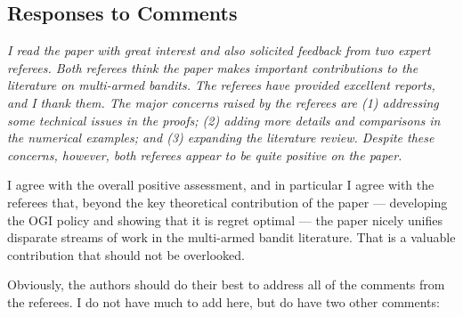 \documentclass[11pt]{article}
\newcommand{\1}{\ensuremath{\mathbf{1}}} %
\theoremstyle{thm-sf}
\begin{document}
	\subsection{Responses to Comments}
	{\it I read the paper with great interest and also solicited feedback from two expert referees. Both referees think the paper makes important contributions to the literature on multi-armed bandits. The referees have provided excellent reports, and I thank them. The major concerns raised by the referees are (1) addressing some technical issues in the proofs; (2) adding more details and comparisons in the numerical examples; and (3) expanding the literature review. Despite these concerns, however, both referees appear to be quite positive on the paper.
		
	I agree with the overall positive assessment, and in particular I agree with the referees that, beyond the key theoretical contribution of the paper --- developing the OGI policy and showing that it is regret optimal --- the paper nicely unifies disparate streams of work in the multi-armed bandit literature. That is a valuable contribution that should not be overlooked.
	
	Obviously, the authors should do their best to address all of the comments from the referees. I do not have much to add here, but do have two other comments:
	} 
\end{document}
